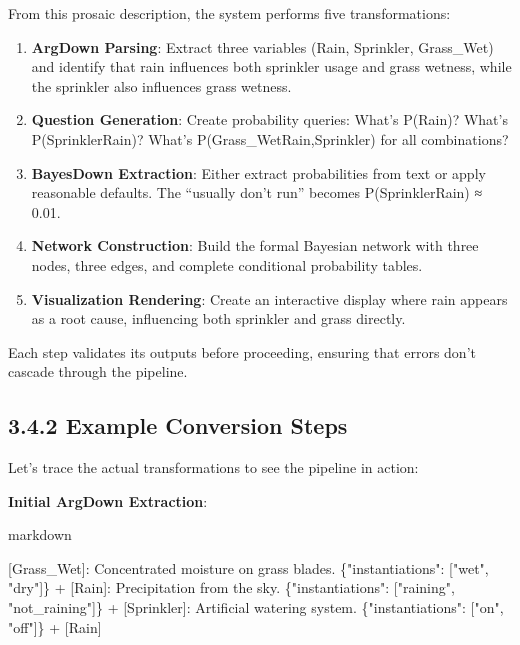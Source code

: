 \documentclass[
  11pt,
  letterpaper,
]{book}
\newenvironment{Shaded}{\begin{snugshade}}{\end{snugshade}}
\newcommand{\CommentTok}[1]{\textcolor[rgb]{0.37,0.37,0.37}{#1}}
\newcommand{\NormalTok}[1]{\textcolor[rgb]{0.00,0.23,0.31}{#1}}
\newcommand{\OtherTok}[1]{\textcolor[rgb]{0.00,0.23,0.31}{#1}}
\newcommand{\SpecialStringTok}[1]{\textcolor[rgb]{0.13,0.47,0.30}{#1}}
\providecommand{\tightlist}{%
  \setlength{\itemsep}{0pt}\setlength{\parskip}{0pt}}
\begin{document}
From this prosaic description, the system performs five transformations:

\begin{enumerate}
\def\labelenumi{\arabic{enumi}.}
\tightlist
\item
  \textbf{ArgDown Parsing}: Extract three variables (Rain, Sprinkler,
  Grass\_Wet) and identify that rain influences both sprinkler usage and
  grass wetness, while the sprinkler also influences grass wetness.
\item
  \textbf{Question Generation}: Create probability queries: What's
  P(Rain)? What's P(Sprinkler\textbar Rain)? What's
  P(Grass\_Wet\textbar Rain,Sprinkler) for all combinations?
\item
  \textbf{BayesDown Extraction}: Either extract probabilities from text
  or apply reasonable defaults. The ``usually don't run'' becomes
  P(Sprinkler\textbar Rain) ≈ 0.01.
\item
  \textbf{Network Construction}: Build the formal Bayesian network with
  three nodes, three edges, and complete conditional probability tables.
\item
  \textbf{Visualization Rendering}: Create an interactive display where
  rain appears as a root cause, influencing both sprinkler and grass
  directly.
\end{enumerate}

Each step validates its outputs before proceeding, ensuring that errors
don't cascade through the pipeline.

\subsection{3.4.2 Example Conversion Steps}\label{sec-rsg-input}

Let's trace the actual transformations to see the pipeline in action:

\textbf{Initial ArgDown Extraction}:

markdown

\begin{Shaded}
\begin{Highlighting}[]
\OtherTok{[Grass\_Wet]: }\NormalTok{Concentrated moisture on grass blades. \{"instantiations": }\CommentTok{[}\OtherTok{"wet", "dry"}\CommentTok{]}\NormalTok{\}    }
\SpecialStringTok{ + }\CommentTok{[}\OtherTok{Rain}\CommentTok{]}\NormalTok{: Precipitation from the sky. \{"instantiations": }\CommentTok{[}\OtherTok{"raining", "not\_raining"}\CommentTok{]}\NormalTok{\}}
\SpecialStringTok{ + }\CommentTok{[}\OtherTok{Sprinkler}\CommentTok{]}\NormalTok{: Artificial watering system. \{"instantiations": }\CommentTok{[}\OtherTok{"on", "off"}\CommentTok{]}\NormalTok{\}}
\SpecialStringTok{   + }\CommentTok{[}\OtherTok{Rain}\CommentTok{]}
\end{Highlighting}
\end{Shaded}
\end{document}
